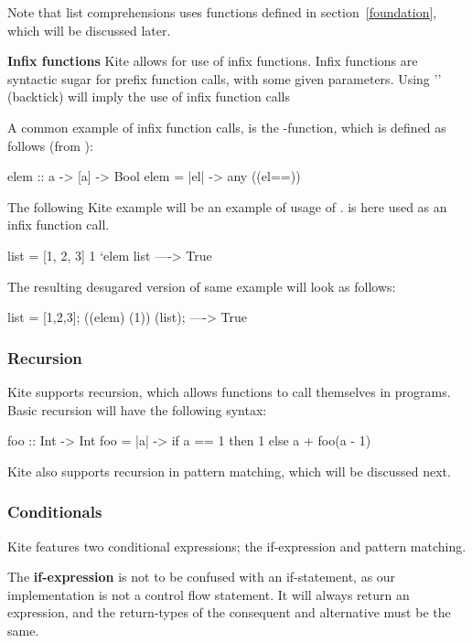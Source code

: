 Note that list comprehensions uses functions defined in section~\ref{foundation}, which will be discussed later.

\textbf{Infix functions} Kite allows for use of infix functions. Infix functions are syntactic sugar for prefix function calls, with some given parameters. Using '\code{\`}' (backtick) will imply the use of infix function calls

A common example of infix function calls, is the -function, which is defined as follows (from ):
\begin{kite}
elem :: a -> [a] -> Bool
elem = |el| -> {
  any ((el==))
}
\end{kite}

The following Kite example will be an example of usage of .  is here used as an infix function call.
\begin{kite}
list = [1, 2, 3]
1 `elem list ----> True
\end{kite}
The resulting desugared version of same example will look as follows:

\begin{kite}
list = [1,2,3];
((elem) (1)) (list); ----> True
\end{kite}

\subsubsection{Recursion}
Kite supports recursion, which allows functions to call themselves in programs. Basic recursion will have the following syntax:
\begin{kite}
foo :: Int -> Int
foo = |a| -> {
  if a == 1 then 1
  else a + foo(a - 1)
}
\end{kite}

Kite also supports recursion in pattern matching, which will be discussed next.

\subsubsection{Conditionals}
\label{subsubsec:conditionals}
Kite features two conditional expressions; the if-expression and pattern matching.

The \textbf{if-expression} is not to be confused with an if-statement, as our implementation is not a control flow statement. It will always return an expression, and the return-types of the consequent and alternative must be the same.


